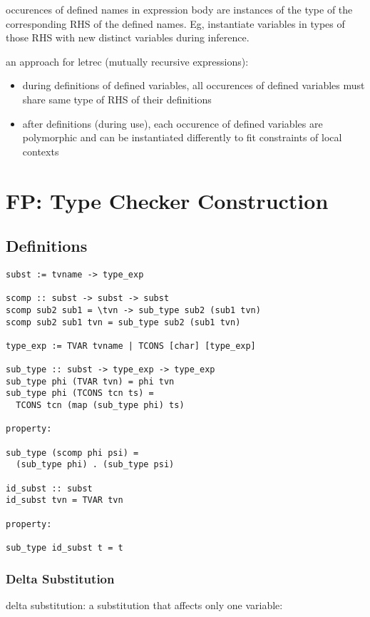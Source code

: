\documentclass[8pt]{extarticle}
\begin{document}
\begin{multicols*}{2}
occurences of defined names in expression body are instances of the type of the corresponding RHS of the defined names. Eg, instantiate variables in types of those RHS with new distinct variables during inference.

an approach for letrec (mutually recursive expressions):
\begin{itemize}
\item during definitions of defined variables, all occurences of defined variables must share same type of RHS of their definitions
\item after definitions (during use), each occurence of defined variables are polymorphic and can be instantiated differently to fit constraints of local contexts
\end{itemize}

\vfill\null
\columnbreak

\section{FP: Type Checker Construction}

\subsection{Definitions}

\begin{verbatim}
subst := tvname -> type_exp

scomp :: subst -> subst -> subst
scomp sub2 sub1 = \tvn -> sub_type sub2 (sub1 tvn)
scomp sub2 sub1 tvn = sub_type sub2 (sub1 tvn)

type_exp := TVAR tvname | TCONS [char] [type_exp]

sub_type :: subst -> type_exp -> type_exp
sub_type phi (TVAR tvn) = phi tvn
sub_type phi (TCONS tcn ts) =
  TCONS tcn (map (sub_type phi) ts)

property:

sub_type (scomp phi psi) =
  (sub_type phi) . (sub_type psi)

id_subst :: subst
id_subst tvn = TVAR tvn

property:

sub_type id_subst t = t
\end{verbatim}

\subsubsection{Delta Substitution}
delta substitution: a substitution that affects only one variable:


\end{multicols*}
\end{document}
